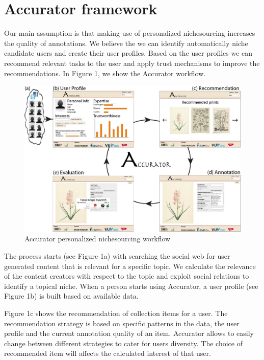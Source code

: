 \section{Accurator framework}
\label{architecture}
Our main assumption is that making use of personalized nichesourcing increases the quality of annotations. We believe the we can identify automatically niche candidate users and create their user profiles. Based on the user profiles we can recommend relevant tasks to the user and apply trust mechanisms to improve the recommendations. In Figure 1, we show the Accurator workflow. 

\begin{figure}[hbt]
	\centering
	\includegraphics[width=\textwidth]{accurator_diagram.jpg}
  	\caption{Accurator personalized nichesourcing workflow}
\end{figure}

The process starts (see Figure 1a) with searching the social web for user generated content that is relevant for a specific topic. We calculate the relevance of the content creators with respect to the topic and exploit social relations to identify a topical niche. When a person starts using Accurator, a user profile (see Figure 1b) is built based on available data.

Figure 1c shows the recommendation of collection items for a user. The recommendation strategy is based on specific patterns in the data, the user profile and the current annotation quality of an item. Accurator allows to easily change between different strategies to cater for users diversity.
The choice of recommended item will affects the calculated interest of that user.

